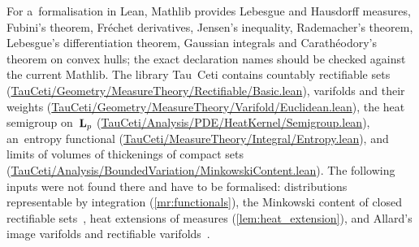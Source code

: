 \documentclass[a4paper,twoside,leqno]{article}
\begin{document}
\begin{remark}
    \label{rem:lean}
    For a~formalisation in Lean, Mathlib provides Lebesgue and Hausdorff measures, Fubini's
    theorem, Fr\'echet derivatives, Jensen's inequality, Rademacher's theorem, Lebesgue's
    differentiation theorem, Gaussian integrals and Carath\'eodory's theorem on convex hulls; the
    exact declaration names should be checked against the current Mathlib. The library Tau~Ceti
    contains countably rectifiable sets (\url{TauCeti/Geometry/MeasureTheory/Rectifiable/Basic.lean}),
    varifolds and their weights (\url{TauCeti/Geometry/MeasureTheory/Varifold/Euclidean.lean}),
    the heat semigroup on~$\mathbf{L}_{p}$ (\url{TauCeti/Analysis/PDE/HeatKernel/Semigroup.lean}),
    an~entropy functional (\url{TauCeti/MeasureTheory/Integral/Entropy.lean}), and limits of
    volumes of thickenings of compact sets
    (\url{TauCeti/Analysis/BoundedVariation/MinkowskiContent.lean}). The following inputs were
    not found there and have to be formalised: distributions representable by integration
    (\ref{mr:functionals}), the Minkowski content of closed rectifiable
    sets~\cite[3.2.39]{Federer1969}, heat extensions of measures (\ref{lem:heat_extension}), and
    Allard's image varifolds and rectifiable varifolds~\cite[3.2, 3.5]{Allard1972}.
\end{remark}



\end{document}
